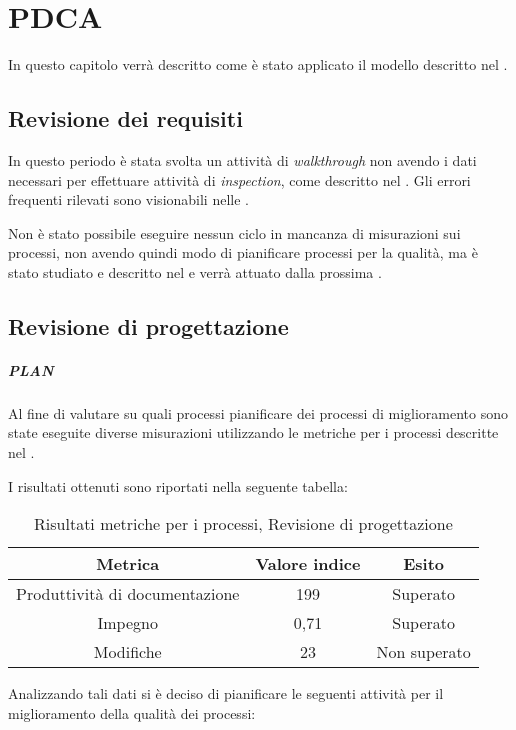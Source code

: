 \section{PDCA}
In questo capitolo verrà descritto come è stato applicato il modello  descritto nel \PianoDiQualifica.

\subsection{Revisione dei requisiti}

In questo periodo è stata svolta un attività di \emph{walkthrough} non avendo i dati necessari per effettuare attività di \emph{inspection}, come descritto nel \PianoDiQualifica. Gli errori frequenti rilevati sono visionabili nelle \NormeDiProgetto.

Non è stato possibile eseguire nessun ciclo  in mancanza di misurazioni sui processi, non avendo quindi modo di pianificare processi per la qualità, ma è stato studiato e descritto nel \PianoDiQualifica{} e verrà attuato dalla prossima .

\subsection{Revisione di progettazione}

\subparagraph{PLAN}

Al fine di valutare su quali processi pianificare dei processi di miglioramento sono state eseguite diverse misurazioni utilizzando le metriche per i processi descritte nel \PianoDiQualifica.

I risultati ottenuti sono riportati nella seguente tabella:

\begin{table}[H]
\centering
\begin{tabular}{ | c | c | c | }
\hline
\textbf{Metrica} & \textbf{Valore indice} & \textbf{Esito} \\
\hline
Produttività di documentazione & 199 & Superato \\
\hline
Impegno & 0,71 & Superato \\
\hline
Modifiche & 23 & Non superato \\
\hline
\end{tabular}
\caption{Risultati metriche per i processi, Revisione di progettazione}
\end{table}

Analizzando tali dati si è deciso di pianificare le seguenti attività per il miglioramento della qualità dei processi:

